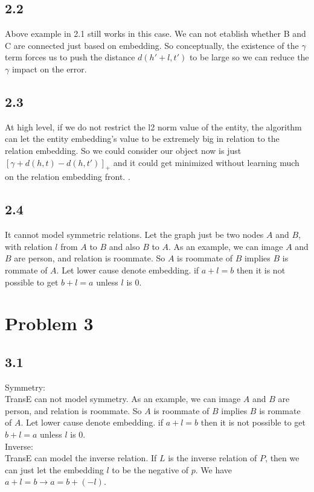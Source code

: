 \documentclass{book}
\begin{document}
\subsection*{2.2}
Above example in 2.1 still works in this case. We can not etablish whether B and C are connected just based on embedding. So conceptually, the existence of the $\gamma$ term forces us to push the distance $d(h' + l, t')$ to be large so we can reduce the $\gamma$ impact on the error. 


\subsection*{2.3}
At high level, if we do not restrict the l2 norm value of the entity, the algorithm can let the entity embedding's value to be extremely big in relation to the relation embedding. So we could consider our object now is just $[\gamma + d(h,t) - d(h,t')]_+$ and it could get minimized without learning much on the relation embedding front. . 




\subsection*{2.4}
It cannot model symmetric relations. Let the graph just be two nodes $A$ and $B$, with relation $l$ from $A$ to $B$ and also $B$ to $A$. As an example, we can image $A$ and $B$ are person, and relation is roommate. So $A$ is roommate of $B$ implies $B$ is rommate of $A$. Let lower cause denote embedding. if $a + l = b$ then it is not possible to get $b + l = a$ unless $l$ is 0. 



\section*{Problem 3}
\subsection*{3.1}
Symmetry: \\
TransE can not model symmetry. As an example, we can image $A$ and $B$ are person, and relation is roommate. So $A$ is roommate of $B$ implies $B$ is rommate of $A$. Let lower cause denote embedding. if $a + l = b$ then it is not possible to get $b + l = a$ unless $l$ is 0. \\

Inverse: \\
TransE can model the inverse relation. If $L$ is the inverse relation of $P$, then we can just let the embedding $l$ to be the negative of $p$. We have $a + l = b \longrightarrow a = b + (-l)$. \\
\end{document}
